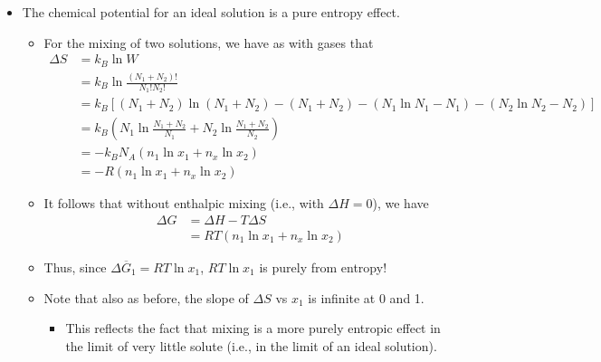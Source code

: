 \documentclass[../notes.tex]{subfiles}
\begin{document}
\begin{itemize}
\begin{itemize}
    \end{itemize}
    \item The chemical potential for an ideal solution is a pure entropy effect.
    \begin{itemize}
        \item For the mixing of two solutions, we have as with gases that
        \begin{align*}
            \Delta S &= k_B\ln W\\
            &= k_B\ln\frac{(N_1+N_2)!}{N_1!N_2!}\\
            &= k_B[(N_1+N_2)\ln(N_1+N_2)-(N_1+N_2)-(N_1\ln N_1-N_1)-(N_2\ln N_2-N_2)]\\
            &= k_B\left( N_1\ln\frac{N_1+N_2}{N_1}+N_2\ln\frac{N_1+N_2}{N_2} \right)\\
            &= -k_BN_A(n_1\ln x_1+n_x\ln x_2)\\
            &= -R(n_1\ln x_1+n_x\ln x_2)
        \end{align*}
        \item It follows that without enthalpic mixing (i.e., with $\Delta H=0$), we have
        \begin{align*}
            \Delta G &= \Delta H-T\Delta S\\
            &= RT(n_1\ln x_1+n_x\ln x_2)
        \end{align*}
        \item Thus, since $\Delta\overline{G}_1=RT\ln x_1$, $RT\ln x_1$ is purely from entropy!
        \item Note that also as before, the slope of $\Delta S$ vs $x_1$ is infinite at 0 and 1.
        \begin{itemize}
            \item This reflects the fact that mixing is a more purely entropic effect in the limit of very little solute (i.e., in the limit of an ideal solution).
        \end{itemize}
    \end{itemize}
\end{itemize}
\end{document}
